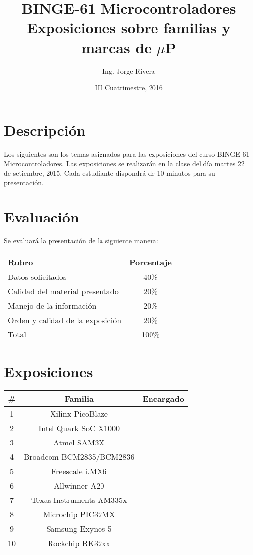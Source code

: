 \documentclass[letterpaper,10pt]{article}
\title{BINGE-61 Microcontroladores\\ Exposiciones sobre familias y marcas de $\mu$P}
\author{Ing. Jorge Rivera}
\date{III Cuatrimestre, 2016}
\begin{document}
\maketitle

\section{Descripción}

Los siguientes son los temas asignados para las exposiciones del curso BINGE-61 Microcontroladores. Las exposiciones se realizarán en la clase del día martes 22 de setiembre, 2015. Cada estudiante dispondrá de 10 minutos para su presentación.

\section{Evaluación}

Se evaluará la presentación de la siguiente manera:

\begin{center}
	\begin{tabular}{|l|c|}
	\hline
	Rubro							& Porcentaje \\ \hline\hline
	Datos solicitados 				& 40\% \\ \hline
	Calidad del material presentado & 20\% \\ \hline
	Manejo de la información		& 20\% \\ \hline
	Orden y calidad de la exposición & 20\% \\ \hline\hline
	Total							& 100\% \\ \hline
\end{tabular} 
\end{center}


\section{Exposiciones}

\begin{center}
\begin{tabular}{|c|c|p{4cm}|}\hline
\#  & Familia 					& Encargado			\\ \hline\hline
1   & Xilinx PicoBlaze      	& 					\\\hline
2   & Intel Quark SoC X1000		& 					\\\hline
3   & Atmel SAM3X		 		& 					\\\hline
4   & Broadcom BCM2835/BCM2836	& 					\\\hline
5   & Freescale i.MX6 			& 					\\\hline

6   & Allwinner A20				& 					\\\hline
7   & Texas Instruments AM335x	& 					\\\hline
8   & Microchip PIC32MX			& 					\\\hline
9   & Samsung Exynos 5			& 					\\\hline
10  & Rockchip RK32xx			&					\\\hline

\end{tabular}
\end{center}
\end{document}
